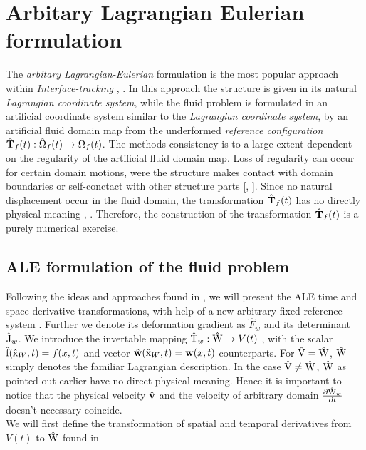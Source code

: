 \newpage
\section{Arbitary Lagrangian Eulerian formulation}
The \textit{arbitary Lagrangian-Eulerian} formulation is the most popular approach within \textit{Interface-tracking} \cite{Richter2010a}, \cite{Frei2016}. In this approach the structure is given in its natural \textit{Lagrangian coordinate system}, while the fluid problem is formulated in an artificial coordinate system similar to the \textit{Lagrangian coordinate system}, by an artificial fluid domain map from the underformed \textit{reference configuration} $\hat{\mathbf{T}}_f (t): \hat{\Omega}_f (t) \rightarrow \Omega_f (t)$. The methods consistency is to a large extent dependent on the regularity of the artificial fluid domain map. Loss of regularity can occur for certain domain motions, were the structure makes contact with domain boundaries or self-conctact with other structure parts  [\cite{Wriggers2006}, \cite{Richter2016}].  Since no natural displacement occur in the fluid domain, the transformation $\hat{\mathbf{T}}_f (t)$ has no directly physical meaning \cite{Richter2010a}, \cite{Donea2004}. Therefore, the construction of the transformation $\hat{\mathbf{T}}_f (t)$ is a purely numerical exercise.
 
\subsection{ALE formulation of the fluid problem}
 
Following the ideas and approaches found in \cite{Richter2016}, we will present the ALE  time and space derivative transformations, with help of a new arbitrary fixed reference system .  Further we denote its deformation gradient as $\hat{F}_w$ and its determinant $\text{\^{J}}_w$. We introduce the invertable mapping $\text{\^{T}}_w : \text{\^{W}} \rightarrow V(t)$ , with the scalar $\text{\^{f}}(\text{\^{x}}_W, t) = f(x,t) $ and vector $\hat{\mathbf{w}}(\text{\^{x}}_W, t) = \mathbf{w}(x,t) $ counterparts.
For $\text{\^{V}} = \text{\^{W}}$, $\text{\^{W}}$ simply denotes the familiar Lagrangian description.
In the case $\text{\^{V}} \neq \text{\^{W}}$, $\text{\^{W}}$ as pointed out earlier have no direct physical meaning.  Hence it is important to notice that the physical velocity $\hat{\mathbf{v}}$ and the velocity of arbitrary domain $\frac{\partial \text{\^{W}}_w}{\partial t}$ doesn't necessary coincide. \\

We will first define the transformation of spatial and temporal derivatives from $V(t)$ to $\text{\^{W}}$ found in \cite{Richter2016}\\

